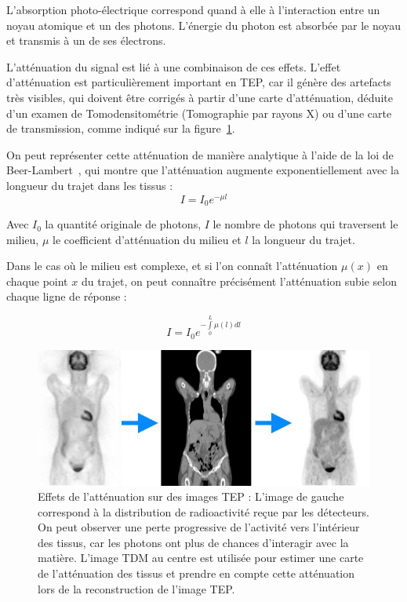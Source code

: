 L'absorption photo-électrique correspond quand à elle à l'interaction entre un noyau atomique et un des photons. L'énergie du photon est absorbée par le noyau et transmis à un de ses électrons. 

L'atténuation du signal est lié à une combinaison de ces effets. L'effet d'atténuation est particulièrement important en TEP, car il génère des artefacts très visibles, qui doivent être corrigés à partir d'une carte d'atténuation, déduite d'un examen de Tomodensitométrie (Tomographie par rayons X) ou d'une carte de transmission, comme indiqué sur la figure~\ref{fig:schemaAtt}.


On peut représenter cette atténuation de manière analytique à l'aide de la loi de Beer-Lambert~\cite{cherry2006pet}, qui montre que l'atténuation augmente exponentiellement avec la longueur du trajet dans les tissus :
\begin{equation}
I = I_0 e^{-\mu l}
\end{equation}

Avec $I_0$ la quantité originale de photons, $I$ le nombre de photons qui traversent le milieu, $\mu$ le coefficient d'atténuation du milieu et $l$ la longueur du trajet. 

Dans le cas où le milieu est complexe, et si l'on connaît l'atténuation $\mu(x)$ en chaque point $x$ du trajet, on peut connaître précisément l'atténuation subie selon chaque ligne de réponse  :

\begin{equation}
I = I_0 e^{- \int\limits^L_0 \mu(l) dl}
\end{equation}


\begin{figure}
\centering
\includegraphics[width=12cm]{images/attenuationNonAtt}
\caption[Effet de l'atténuation sur les images TEP]{Effets de l'atténuation sur des images TEP : L'image de gauche correspond à la distribution de radioactivité reçue par les détecteurs. On peut observer une perte progressive de l'activité vers l'intérieur des tissus, car les photons ont plus de chances d'interagir avec la matière. L'image TDM au centre est utilisée pour estimer une carte de l'atténuation des tissus et prendre en compte cette atténuation lors de la reconstruction de l'image TEP.}
\label{fig:schemaAtt}
\end{figure}

